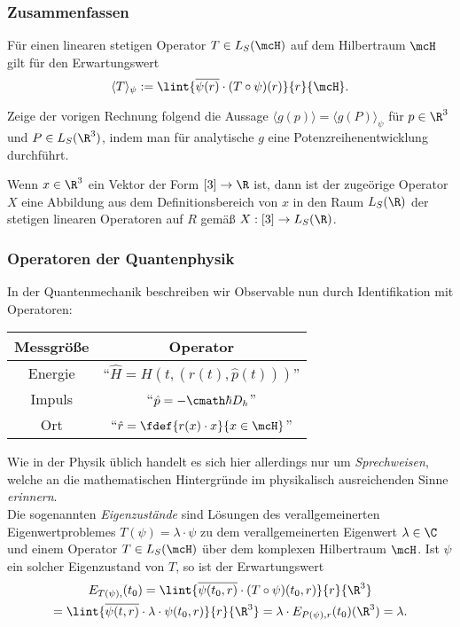 \documentclass{subfiles}
\begin{document}
        \subsubsection*{Zusammenfassen}
            Für einen linearen stetigen Operator $T\in L_S(\mcH)$ auf dem Hilbertraum $\mcH$ gilt für den Erwartungswert 
            \[\langle T\rangle_\psi := \lint{\overline{\psi(r)}\cdot (T\circ\psi)(r)}{r}{\mcH}.\]

            \begin{Aufgabe}
                \nr{} Zeige der vorigen Rechnung folgend die Aussage $\langle g(p)\rangle = \langle g(P)\rangle_\psi$ für $p\in\R^3$ und $P\in L_S(\R^3)$, indem man für analytische $g$ eine Potenzreihenentwicklung durchführt. 
            \end{Aufgabe}

        Wenn $x\in\R^3$ ein Vektor der Form $[3]\to\R$ ist, dann ist der zugeörige Operator $X$ eine Abbildung aus dem Definitionsbereich von $x$ in den Raum $L_S(\R)$ der stetigen linearen Operatoren auf $R$ gemäß $X:[3]\to L_S(\R)$. 

        \subsubsection*{Operatoren der Quantenphysik}
            In der Quantenmechanik beschreiben wir Observable nun durch Identifikation mit Operatoren:
            \begin{table}[H]
                \centering
                \begin{tabular}{c|c}
                    Messgröße & Operator \\
                    \hline
                    Energie & \enquote{$\hat H = H(t,(r(t),\hat p(t)))$} \\
                    Impuls & \enquote{$\hat p = -\cmath\hbar D_h$} \\
                    Ort & \enquote{$\hat r = \fdef{r(x)\cdot x}{x\in\mcH}$}
                \end{tabular}
            \end{table}
            Wie in der Physik üblich handelt es sich hier allerdings nur um \emph{Sprechweisen}, welche an die mathematischen Hintergründe im physikalisch ausreichenden Sinne \emph{erinnern}. \\

            Die sogenannten \emph{Eigenzustände} sind Lösungen des verallgemeinerten Eigenwertproblemes $T(\psi) = \lambda\cdot\psi$ zu dem verallgemeinerten Eigenwert $\lambda\in\C$ und einem Operator $T\in L_S(\mcH)$ über dem komplexen Hilbertraum $\mcH$. Ist $\psi$ ein solcher Eigenzustand von $T$, so ist der Erwartungswert 
            \begin{multline*}
                E_{T(\psi),}(t_0) = \lint{\overline{\psi(t_0,r)}\cdot (T\circ\psi)(t_0,r)}{r}{\R^3} \\
                = \lint{\overline{\psi(t,r)}\cdot \lambda\cdot\psi(t_0,r)}{r}{\R^3} = \lambda\cdot E_{P(\psi),r}(t_0)(\R^3) = \lambda.
            \end{multline*}
            
\end{document}
